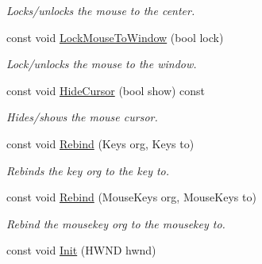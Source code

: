 \begin{DoxyCompactItemize}
\begin{DoxyCompactList}\small\item\em Locks/unlocks the mouse to the center. \end{DoxyCompactList}\item 
const void \hyperlink{class_ensum_1_1_input_1_1_input_a99e2d54f15ba9449057d0850e8c9c752}{Lock\+Mouse\+To\+Window} (bool lock)\hypertarget{class_ensum_1_1_input_1_1_input_a99e2d54f15ba9449057d0850e8c9c752}{}\label{class_ensum_1_1_input_1_1_input_a99e2d54f15ba9449057d0850e8c9c752}

\begin{DoxyCompactList}\small\item\em Lock/unlocks the mouse to the window. \end{DoxyCompactList}\item 
const void \hyperlink{class_ensum_1_1_input_1_1_input_a7474a1ff2d8dd75cc7b594514dd762ed}{Hide\+Cursor} (bool show) const \hypertarget{class_ensum_1_1_input_1_1_input_a7474a1ff2d8dd75cc7b594514dd762ed}{}\label{class_ensum_1_1_input_1_1_input_a7474a1ff2d8dd75cc7b594514dd762ed}

\begin{DoxyCompactList}\small\item\em Hides/shows the mouse cursor. \end{DoxyCompactList}\item 
const void \hyperlink{class_ensum_1_1_input_1_1_input_a44634caec75e410c5652cdb041a33d55}{Rebind} (Keys org, Keys to)\hypertarget{class_ensum_1_1_input_1_1_input_a44634caec75e410c5652cdb041a33d55}{}\label{class_ensum_1_1_input_1_1_input_a44634caec75e410c5652cdb041a33d55}

\begin{DoxyCompactList}\small\item\em Rebinds the key org to the key to. \end{DoxyCompactList}\item 
const void \hyperlink{class_ensum_1_1_input_1_1_input_a368908dcc45e31fed3cd6c7da59033d0}{Rebind} (Mouse\+Keys org, Mouse\+Keys to)\hypertarget{class_ensum_1_1_input_1_1_input_a368908dcc45e31fed3cd6c7da59033d0}{}\label{class_ensum_1_1_input_1_1_input_a368908dcc45e31fed3cd6c7da59033d0}

\begin{DoxyCompactList}\small\item\em Rebind the mousekey org to the mousekey to. \end{DoxyCompactList}\item 
const void \hyperlink{class_ensum_1_1_input_1_1_input_a4bb72a770bc738add5e108851e6f5467}{Init} (H\+W\+ND hwnd)\hypertarget{class_ensum_1_1_input_1_1_input_a4bb72a770bc738add5e108851e6f5467}{}\label{class_ensum_1_1_input_1_1_input_a4bb72a770bc738add5e108851e6f5467}


\end{DoxyCompactItemize}
